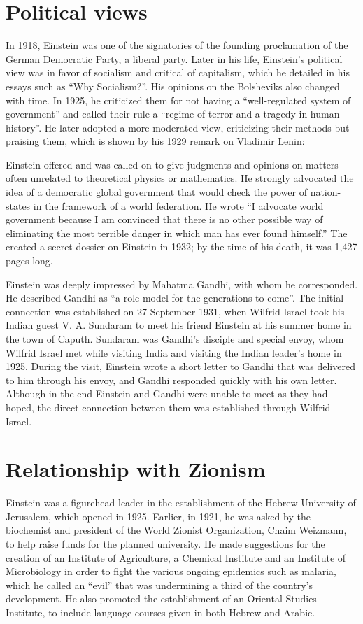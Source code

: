 \documentclass[twoside]{memoir}
\begin{document}
\section{Political views}
In 1918, Einstein was one of the signatories of the founding proclamation of the German Democratic Party, a liberal party. Later in his life, Einstein's political view was in favor of socialism and critical of capitalism, which he detailed in his essays such as \enquote{Why Socialism?}. His opinions on the Bolsheviks also changed with time. In 1925, he criticized them for not having a \enquote{well-regulated system of government} and called their rule a \enquote{regime of terror and a tragedy in human history}. He later adopted a more moderated view, criticizing their methods but praising them, which is shown by his 1929 remark on Vladimir Lenin:

Einstein offered and was called on to give judgments and opinions on matters often unrelated to theoretical physics or mathematics. He strongly advocated the idea of a democratic global government that would check the power of nation-states in the framework of a world federation. He wrote \enquote{I advocate world government because I am convinced that there is no other possible way of eliminating the most terrible danger in which man has ever found himself.} The  created a secret dossier on Einstein in 1932; by the time of his death, it was 1,427 pages long.

Einstein was deeply impressed by Mahatma Gandhi, with whom he corresponded. He described Gandhi as \enquote{a role model for the generations to come}. The initial connection was established on 27 September 1931, when Wilfrid Israel took his Indian guest V. A. Sundaram to meet his friend Einstein at his summer home in the town of Caputh. Sundaram was Gandhi's disciple and special envoy, whom Wilfrid Israel met while visiting India and visiting the Indian leader's home in 1925. During the visit, Einstein wrote a short letter to Gandhi that was delivered to him through his envoy, and Gandhi responded quickly with his own letter. Although in the end Einstein and Gandhi were unable to meet as they had hoped, the direct connection between them was established through Wilfrid Israel.
\section{Relationship with Zionism}
Einstein was a figurehead leader in the establishment of the Hebrew University of Jerusalem, which opened in 1925. Earlier, in 1921, he was asked by the biochemist and president of the World Zionist Organization, Chaim Weizmann, to help raise funds for the planned university. He made suggestions for the creation of an Institute of Agriculture, a Chemical Institute and an Institute of Microbiology in order to fight the various ongoing epidemics such as malaria, which he called an \enquote{evil} that was undermining a third of the country's development. He also promoted the establishment of an Oriental Studies Institute, to include language courses given in both Hebrew and Arabic.
\end{document}
